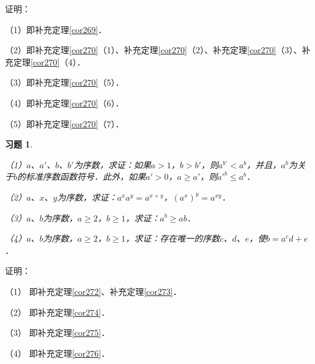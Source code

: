 \documentclass[12pt, a4paper, oneside]{book}
\newtheorem{exer}{习题}
\begin{document}
			证明：
			\par
			（1）即补充定理\ref{cor269}．
			\par
			（2）即补充定理\ref{cor270}（1）、补充定理\ref{cor270}（2）、补充定理\ref{cor270}（3）、补充定理\ref{cor270}（4）．
			\par
			（3）即补充定理\ref{cor270}（5）．
			\par
			（4）即补充定理\ref{cor270}（6）．
			\par
			（5）即补充定理\ref{cor270}（7）．
			
			\begin{exer}\label{exer118}
				\hfill\par
				（1）$a$、$a'$、$b$、$b'$为序数，求证：如果$a>1$，$b>b'$，则$a^{b'}<a^b$，并且，$a^b$为关于$b$的标准序数函数符号．此外，如果$a'>0$，$a\geq a'$，则${a'}^b\leq a^b$．
				\par
				（2）$a$、$x$、$y$为序数，求证：$a^xa^y=a^{x+y}$，$(a^x)^y=a^{xy}$．
				\par
				（3）$a$、$b$为序数，$a\geq 2$，$b\geq 1$，求证：$a^b\geq ab$．
				\par
				（4）$a$、$b$为序数，$a\geq 2$，$b\geq 1$，求证：存在唯一的序数$c$、$d$、$e$，使$b=a^cd+e$．
			\end{exer}
			证明：
			\par
			（1）	即补充定理\ref{cor272}、补充定理\ref{cor273}．
			\par
			（2）	即补充定理\ref{cor274}．
			\par
			（3）	即补充定理\ref{cor275}．
			\par
			（4）	即补充定理\ref{cor276}．
			
\end{document}
